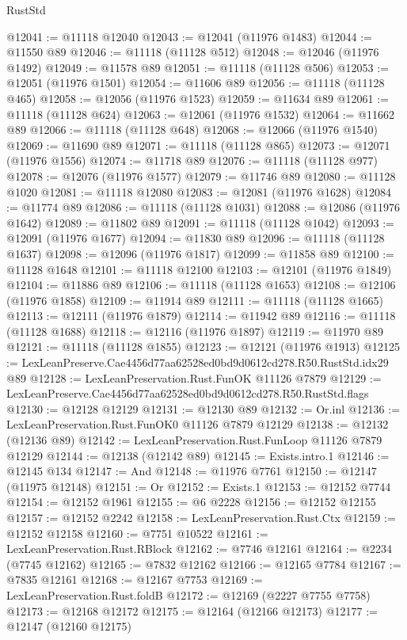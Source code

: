\begin{lexlean}{RustStd}
\begin{coremodule}
@12041 := @11118 @12040
@12043 := @12041 (@11976 @1483)
@12044 := @11550 @89
@12046 := @11118 (@11128 @512)
@12048 := @12046 (@11976 @1492)
@12049 := @11578 @89
@12051 := @11118 (@11128 @506)
@12053 := @12051 (@11976 @1501)
@12054 := @11606 @89
@12056 := @11118 (@11128 @465)
@12058 := @12056 (@11976 @1523)
@12059 := @11634 @89
@12061 := @11118 (@11128 @624)
@12063 := @12061 (@11976 @1532)
@12064 := @11662 @89
@12066 := @11118 (@11128 @648)
@12068 := @12066 (@11976 @1540)
@12069 := @11690 @89
@12071 := @11118 (@11128 @865)
@12073 := @12071 (@11976 @1556)
@12074 := @11718 @89
@12076 := @11118 (@11128 @977)
@12078 := @12076 (@11976 @1577)
@12079 := @11746 @89
@12080 := @11128 @1020
@12081 := @11118 @12080
@12083 := @12081 (@11976 @1628)
@12084 := @11774 @89
@12086 := @11118 (@11128 @1031)
@12088 := @12086 (@11976 @1642)
@12089 := @11802 @89
@12091 := @11118 (@11128 @1042)
@12093 := @12091 (@11976 @1677)
@12094 := @11830 @89
@12096 := @11118 (@11128 @1637)
@12098 := @12096 (@11976 @1817)
@12099 := @11858 @89
@12100 := @11128 @1648
@12101 := @11118 @12100
@12103 := @12101 (@11976 @1849)
@12104 := @11886 @89
@12106 := @11118 (@11128 @1653)
@12108 := @12106 (@11976 @1858)
@12109 := @11914 @89
@12111 := @11118 (@11128 @1665)
@12113 := @12111 (@11976 @1879)
@12114 := @11942 @89
@12116 := @11118 (@11128 @1688)
@12118 := @12116 (@11976 @1897)
@12119 := @11970 @89
@12121 := @11118 (@11128 @1855)
@12123 := @12121 (@11976 @1913)
@12125 := LexLeanPreserve.Cae4456d77aa62528ed0bd9d0612cd278.R50.RustStd.idx29 @89
@12128 := LexLeanPreservation.Rust.FunOK @11126 @7879
@12129 := LexLeanPreserve.Cae4456d77aa62528ed0bd9d0612cd278.R50.RustStd.flags
@12130 := @12128 @12129
@12131 := @12130 @89
@12132 := Or.inl
@12136 := LexLeanPreservation.Rust.FunOK0 @11126 @7879 @12129
@12138 := @12132 (@12136 @89)
@12142 := LexLeanPreservation.Rust.FunLoop @11126 @7879 @12129
@12144 := @12138 (@12142 @89)
@12145 := Exists.intro.{1}
@12146 := @12145 @134
@12147 := And
@12148 := @11976 @7761
@12150 := @12147 (@11975 @12148)
@12151 := Or
@12152 := Exists.{1}
@12153 := @12152 @7744
@12154 := @12152 @1961
@12155 := @6 @2228
@12156 := @12152 @12155
@12157 := @12152 @2242
@12158 := LexLeanPreservation.Rust.Ctx
@12159 := @12152 @12158
@12160 := @7751 @10522
@12161 := LexLeanPreservation.Rust.RBlock
@12162 := @7746 @12161
@12164 := @2234 (@7745 @12162)
@12165 := @7832 @12162
@12166 := @12165 @7784
@12167 := @7835 @12161
@12168 := @12167 @7753
@12169 := LexLeanPreservation.Rust.foldB
@12172 := @12169 (@2227 @7755 @7758)
@12173 := @12168 @12172
@12175 := @12164 (@12166 @12173)
@12177 := @12147 (@12160 @12175)

\end{coremodule}
\end{lexlean}
